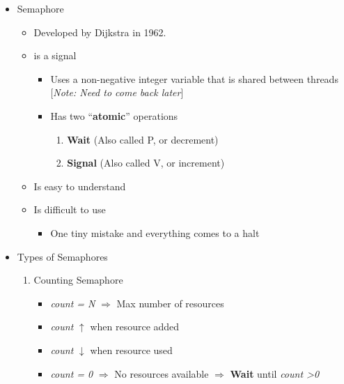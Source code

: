\documentclass[12pt]{article}
\begin{document}
\begin{itemize}
    \item Semaphore
    \begin{itemize}
        \item Developed by Dijkstra in 1962.
        \item is a signal
        \begin{itemize}
            \item Uses a non-negative integer variable that is shared between threads
            [\textit{Note: Need to come back later}]
            \item Has two ``\textbf{atomic}'' operations
            \begin{enumerate}[1.]
                \item \textbf{Wait} (Also called P, or decrement)
                \item \textbf{Signal} (Also called V, or increment)
            \end{enumerate}
        \end{itemize}
        \item Is easy to understand
        \item Is difficult to use
        \begin{itemize}
            \item One tiny mistake and everything comes to a halt
        \end{itemize}
    \end{itemize}

    \item Types of Semaphores
    \begin{enumerate}[1.]
        \item Counting Semaphore
        \begin{itemize}
            \item \textit{count = N} $\Rightarrow$ Max number of resources
            \item \textit{count} $\uparrow$ when resource added
            \item \textit{count} $\downarrow$ when resource used
            \item \textit{count = 0} $\Rightarrow$ No resources available $\Rightarrow$ \textbf{Wait} until \textit{count \textgreater 0}
        \end{itemize}


\end{enumerate}
\end{itemize}
\end{document}
